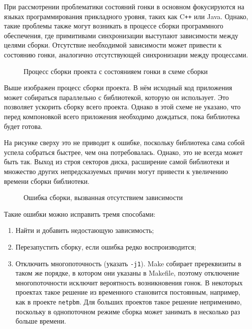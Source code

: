 При рассмотрении проблематики состояний гонки в основном фокусируются на языках программирования прикладного уровня, таких как C\texttt{++} или Java. Однако, такие проблемы также могут возникать в процессе сборки программного обеспечения, где примитивами синхронизации выступают зависимости между целями сборки. Отсутствие необходимой зависимости может привести к состоянию гонки, аналогично отсутствующей синхронизации между процессами.

\begin{figure}[H]
	\centering
    
    \caption{Процесс сборки проекта с состоянияем гонки в схеме сборки}
    \label{fig:project-sample}
\end{figure}

Выше изображен процесс сборки проекта. В нём исходный код приложения может собираться параллельно с библиотекой, которую он использует. Это позволяет ускорить сборку всего проекта. Однако в этой схеме не указано, что перед компоновкой всего приложения необходимо дождаться, пока библиотека будет готова.

На рисунке сверху это не приводит к ошибке, поскольку библиотека сама собой успела собраться быстрее, чем она потребовалась. Однако, это не всегда может быть так. Выход из строя секторов диска, расширение самой библиотеки и множество других непредсказуемых причин могут привести к увеличению времени сборки библиотеки.

\begin{figure}[H]
	\centering
    
    \caption{Ошибка сборки, вызванная отсутствием зависимости}
    \label{fig:project-sample-error}
\end{figure}

Такие ошибки можно исправить тремя способами:

\begin{enumerate}
    \item Найти и добавить недостающую зависимость;
    \item Перезапустить сборку, если ошибка редко воспроизводится;
    \item Отключить многопоточность (указать \texttt{-j1}). Make собирает пререквизиты в таком же порядке, в котором они указаны в Makefile, поэтому отключение многопоточности исключит вероятность возникновения гонок. В некоторых проектах такое решение из временного становится постоянным, например, как в проекте \texttt{netpbm}. Для больших проектов такое решение неприменимо, поскольку в однопоточном режиме сборка может занимать в несколько раз больше времени.
\end{enumerate}

